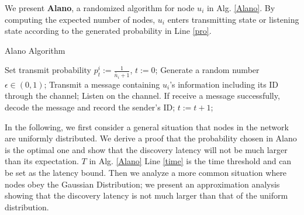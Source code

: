 We present \textbf{Alano}, a randomized algorithm for node $u_i$ in Alg. \ref{Alano}.
By computing the expected number of nodes, $u_i$ enters transmitting state or listening state according to the generated probability in Line \ref{pro}.


\begin{algorithm}
\caption{Alano Algorithm}
\label{Alano}
\begin{algorithmic}[1]
\STATE Set transmit probability $p_t^i := \frac{1}{\widetilde{n_i}+1}$, $t := 0$;  \label{pro}
		\label{time}%
	\STATE Generate a random number $\epsilon \in (0,1)$;  
    		\STATE Transmit a message containing $u_i$'s information including its ID through the channel;
	\ELSE
    		\STATE Listen on the channel. If receive a message successfully, decode the message and record the sender's ID;
	\ENDIF
	\STATE $t:= t+1$;
\ENDWHILE
\end{algorithmic}
\end{algorithm}

In the following, we first consider a general situation that nodes
in the network are uniformly distributed. We derive a proof that the
probability chosen in Alano is the optimal one and show that the discovery
latency will not be much larger than its expectation. $T$ in Alg.
\ref{Alano} Line \ref{time} is the time threshold and can be set as the
latency bound. Then we analyze a more common situation where nodes obey
the Gaussian Distribution; we present an approximation analysis showing that the
discovery latency is not much larger than that of the uniform distribution.


